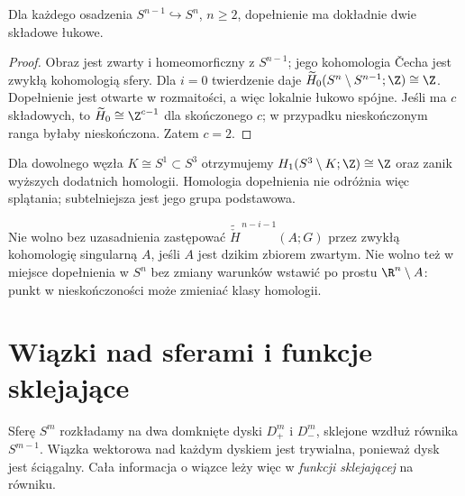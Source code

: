 \begin{wniosek}
Dla każdego osadzenia $S^{n-1}\hookrightarrow S^n$, $n\ge2$,
dopełnienie ma dokładnie dwie składowe łukowe.
\end{wniosek}
\begin{proof}
Obraz jest zwarty i homeomorficzny z $S^{n-1}$;
jego kohomologia \v{C}echa jest zwykłą kohomologią sfery.
Dla $i=0$ twierdzenie daje
$\widetilde H_0(S^n\setminus S^{n-1};\Z)\cong\Z$.
Dopełnienie jest otwarte w rozmaitości, a więc lokalnie
łukowo spójne. Jeśli ma $c$ składowych, to
$\widetilde H_0\cong\Z^{c-1}$ dla skończonego $c$;
w przypadku nieskończonym ranga byłaby nieskończona.
Zatem $c=2$.
\end{proof}

\begin{przyklad}
Dla dowolnego węzła $K\cong S^1\subset S^3$ otrzymujemy
$H_1(S^3\setminus K;\Z)\cong\Z$ oraz zanik wyższych
dodatnich homologii. Homologia dopełnienia nie odróżnia
więc splątania; subtelniejsza jest jego grupa podstawowa.
\end{przyklad}

\begin{uwaga}
Nie wolno bez uzasadnienia zastępować
$\widetilde{\check H}^{\,n-i-1}(A;G)$ przez zwykłą
kohomologię singularną $A$, jeśli $A$ jest dzikim zbiorem
zwartym. Nie wolno też w miejsce dopełnienia w $S^n$
bez zmiany warunków wstawić po prostu $\R^n\setminus A$:
punkt w nieskończoności może zmieniać klasy homologii.
\end{uwaga}

\section{Wiązki nad sferami i funkcje sklejające}
\label{sec:clutching-16}

Sferę $S^m$ rozkładamy na dwa
domknięte dyski $D^m_+$ i $D^m_-$,
sklejone wzdłuż równika
$S^{m-1}$. Wiązka wektorowa
nad każdym dyskiem jest
trywialna, ponieważ dysk
jest ściągalny. Cała informacja
o wiązce leży więc w
\emph{funkcji sklejającej}
na równiku.

